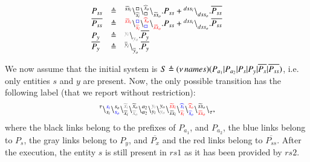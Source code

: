 \begin{example}
\[
\begin{array}{lcl}
P_{ss}&\defeq &\startchain{\widetilde{ss}_i}\chainedlink{\widehat{s}_i}{\noact}\chainedlink{\noact}{\widehat{s}_o}\chainend{\widetilde{ss}_o}.P_{ss}+
\startchain{dss_i}   \chainend{dss_o}.\overline{P_{ss}} \\
\overline{P_{ss}}&\defeq &\startchain{{\color{red}\widetilde{ss}_i}}\chainedlink{{\color{red}\widehat{s}_i}}{{\color{blue}\noact}}\chainedlink{{\color{blue}\noact}}{{\color{red}\widehat{s}_o}}\chainend{{\color{red}\widetilde{ss}_o}}.P_{ss}
+
\startchain{dss_i}\chainend{dss_o}.\overline{P_{ss}}\\
P_{y}&\defeq &\startchain{{\color{gray}y_i}}\chainend{{\color{gray}y_o}}.\overline{P_{y}} \\
\overline{P_{y}}&\defeq &
\startchain{\overline{y}_i}\chainend{\overline{y}_o}.\overline{P_{y}}
\end{array}
\]

\end{example}

\noindent
We now assume that the initial system is $S \triangleq (\nu\, names)(P_{a_1}|P_{a_2}|P_s|P_y|\overline{P_x}|\overline{P_{ss}})$, i.e.
only entities $s$ and $y$ are present. Now, the only possible transition has  the following label (that we report without restriction):
\[
\startchain{\silent}\chainedlink{s_i}{{\color{blue}s_i}}\chainedlink{{\color{blue}s_o}}{s_o}\chainedlink{\widetilde{x}_i}{{\color{gray}\widetilde{x}_i}}\chainedlink{{\color{gray}\widetilde{x}_o}}{\widetilde{x}_o} \chainedlink{a_2}{a_2}\chainedlink{y_i}{ {\color{gray}y_i}}\chainedlink{{\color{gray}y_o}}{y_o}\chainedlink{\widetilde{ss}_i}{{\color{red}\widetilde{ss}_i}}
\chainedlink{{\color{red}\widehat{s}_i}}{{\color{blue}\widehat{s}_i}}
\chainedlink{{\color{blue}\widehat{s}_o}}{{\color{red}\widehat{s}_o}}
\chainedlink{{\color{red}\widetilde{ss}_o}}{\widetilde{ss}_o}\chainend{\silent},
\]
where the black links belong to the prefixes of $P_{a_1}$, and $P_{a_2}$, the blue links belong to $P_s$, the gray links belong to $P_y$, and $\overline{P_x}$ and the red links belong to $\overline{P_{ss}}$.
After the execution, the entity $s$ is still present in $rs1$ as it has been provided by $rs2$.\\

